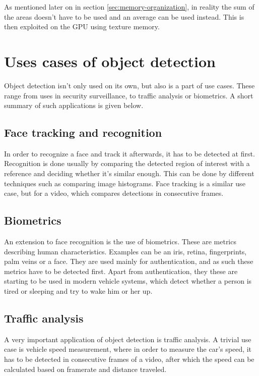 As mentioned later on in section \ref{sec:memory-organization}, in reality the sum of the areas doesn't have to be used and an average can be used instead. This is then exploited on the GPU using texture memory.

\section{Uses cases of object detection}\label{sec:use-cases}

Object detection isn't only used on its own, but also is a part of use cases. These range from uses in security surveillance, to traffic analysis or biometrics. A short summary of such applications is given below.

\subsection{Face tracking and recognition}\label{subsec:uc-face-tracking}

In order to recognize a face and track it afterwards, it has to be detected at first. Recognition is done usually by comparing the detected region of interest with a reference and deciding whether it's similar enough. This can be done by different techniques such as comparing image histograms. Face tracking is a similar use case, but for a video, which compares detections in consecutive frames.

\subsection{Biometrics}\label{subsec:uc-biometrics}

An extension to face recognition is the use of biometrics. These are metrics describing human characteristics. Examples can be an iris, retina, fingerprints, palm veins or a face. They are used mainly for authentication, and as such these metrics have to be detected first. Apart from authentication, they these are starting to be used in modern vehicle systems, which detect whether a person is tired or sleeping and try to wake him or her up.

\subsection{Traffic analysis}\label{subsec:uc-traffic-analysis}

A very important application of object detection is traffic analysis. A trivial use case is vehicle speed measurement, where in order to measure the car's speed, it has to be detected in consecutive frames of a video, after which the speed can be calculated based on framerate and distance traveled.

